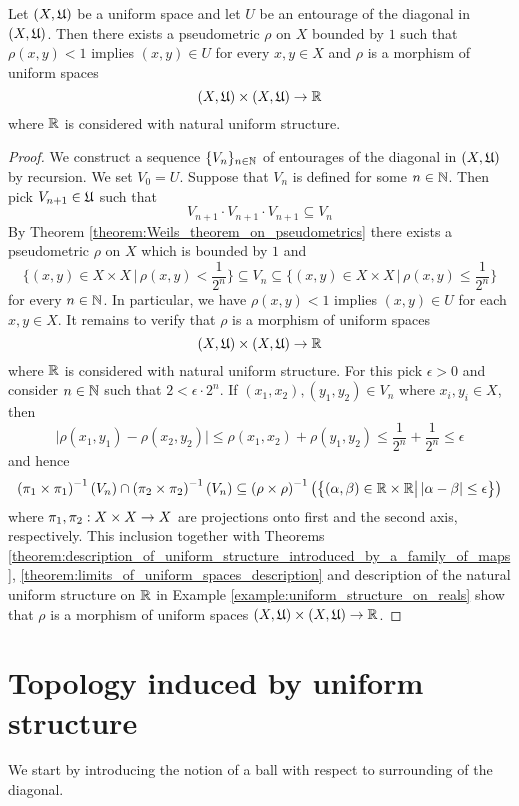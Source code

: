 \begin{theorem}\label{theorem:pseudometric_associated_to_entourage_is_uniform}
Let $(X,{\mathfrak U})$ be a uniform space and let $U$ be an entourage of the diagonal in $(X,{\mathfrak U})$. Then there exists a pseudometric $\rho$ on $X$ bounded by $1$ such that $\rho(x,y) < 1$ implies $(x,y)\in U$ for every $x,y\in X$ and $\rho$ is a morphism of uniform spaces
$$\left(X,{\mathfrak U}\right)\times \left(X,{\mathfrak U}\right) \rightarrow {\mathbb R}$$
where ${\mathbb R}$ is considered with natural uniform structure.
\end{theorem}
\begin{proof}
We construct a sequence $\{V_n\}_{n\in {\mathbb N}}$ of entourages of the diagonal in $\left(X,{\mathfrak U}\right)$ by recursion. We set $V_0 = U$. Suppose that $V_n$ is defined for some $n\in {\mathbb N}$. Then pick $V_{n+1}\in {\mathfrak U}$ such that 
$$V_{n+1}\cdot V_{n+1}\cdot V_{n+1} \subseteq V_n$$
By Theorem \ref{theorem:Weils_theorem_on_pseudometrics} there exists a pseudometric $\rho$ on $X$ which is bounded by $1$ and
$$\bigg\{(x,y)\in X\times X\,\bigg|\,\rho(x,y)<\frac{1}{2^n}\bigg\} \subseteq V_n \subseteq \bigg\{(x,y)\in X\times X\,\bigg|\,\rho(x,y) \leq \frac{1}{2^n}\bigg\}$$
for every $n\in {\mathbb N}$. In particular, we have $\rho(x,y) < 1$ implies $(x,y)\in U$ for each $x,y\in X$. It remains to verify that $\rho$ is a morphism of uniform spaces
$$\left(X,{\mathfrak U}\right)\times \left(X,{\mathfrak U}\right) \rightarrow {\mathbb R}$$
where ${\mathbb R}$ is considered with natural uniform structure. For this pick $\epsilon > 0$ and consider $n\in {\mathbb N}$ such that $2 < \epsilon\cdot 2^n$. If $(x_1,x_2),(y_1,y_2)\in V_n$ where $x_i,y_i\in X$, then
$$\big|\rho(x_1,y_1) - \rho(x_2,y_2)\big|\leq \rho(x_1,x_2) + \rho(y_1,y_2) \leq \frac{1}{2^n} + \frac{1}{2^n} \leq \epsilon$$
and hence
$$\left(\pi_1\times \pi_1\right)^{-1}\left(V_n\right)\cap \left(\pi_2\times \pi_2\right)^{-1}\left(V_n\right) \subseteq \left(\rho\times \rho\right)^{-1}\left(\big\{(\alpha, \beta)\in {\mathbb R}\times {\mathbb R}\big|\,|\alpha - \beta| \leq \epsilon\big\}\right)$$
where $\pi_1,\pi_2:X\times X\rightarrow X$ are projections onto first and the second axis, respectively. This inclusion together with Theorems \ref{theorem:description_of_uniform_structure_introduced_by_a_family_of_maps}, \ref{theorem:limits_of_uniform_spaces_description} and description of the natural uniform structure on ${\mathbb R}$ in Example \ref{example:uniform_structure_on_reals} show that $\rho$ is a morphism of uniform spaces $\left(X,{\mathfrak U}\right)\times \left(X,{\mathfrak U}\right) \rightarrow {\mathbb R}$.
\end{proof}

\section{Topology induced by uniform structure}
\noindent
We start by introducing the notion of a ball with respect to surrounding of the diagonal.

